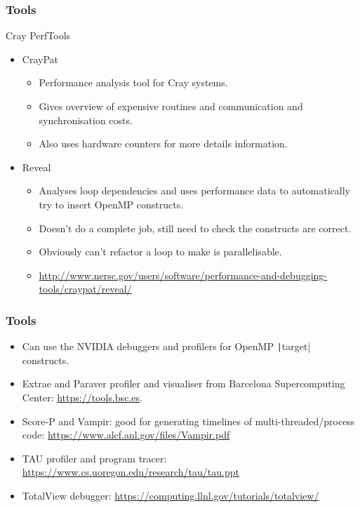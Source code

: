 \documentclass{beamer}
\begin{document}
\begin{frame}
\frametitle{Tools}
Cray PerfTools
\begin{itemize}
  \item CrayPat
    \begin{itemize}
      \item Performance analysis tool for Cray systems.
      \item Gives overview of expensive routines and communication and synchronisation costs.
      \item Also uses hardware counters for more details information.
    \end{itemize}
  \item Reveal
    \begin{itemize}
      \item Analyses loop dependencies and uses performance data to automatically try to insert OpenMP constructs.
      \item Doesn't do a complete job, still need to check the constructs are correct.
      \item Obviously can't refactor a loop to make is parallelisable.
      \item \url{http://www.nersc.gov/users/software/performance-and-debugging-tools/craypat/reveal/}
    \end{itemize}
\end{itemize}
\end{frame}

\begin{frame}
\frametitle{Tools}
\begin{itemize}
  \item Can use the NVIDIA debuggers and profilers for OpenMP \texttt|target| constructs.
  \item Extrae and Paraver profiler and visualiser from Barcelona Supercomputing Center: \url{https://tools.bsc.es}.
  \item Score-P and Vampir: good for generating timelines of multi-threaded/process code: \url{https://www.alcf.anl.gov/files/Vampir.pdf}
  \item TAU profiler and program tracer: \url{https://www.cs.uoregon.edu/research/tau/tau.ppt}
  \item TotalView debugger: \url{https://computing.llnl.gov/tutorials/totalview/}
\end{itemize}
\end{frame}
\end{document}
